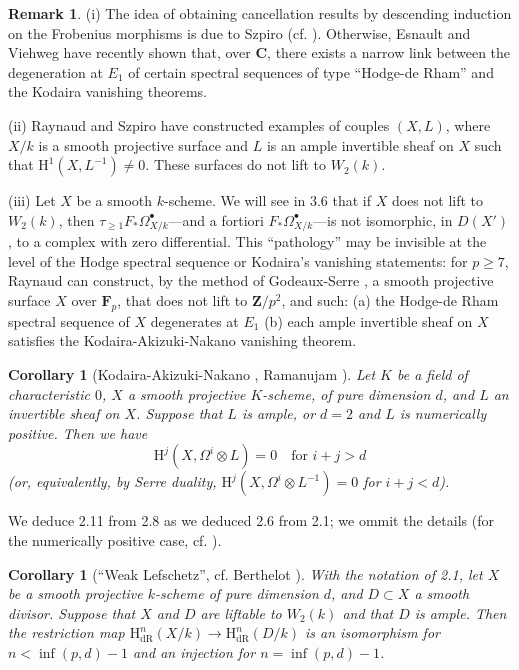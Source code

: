 \documentclass[10pt,reqno]{article}
\newcommand{\mbold}{\mathbf}
\newcommand{\dR}{\mathrm{dR}}
\renewcommand{\H}{\mathrm{H}}
\newcommand{\al}{_\ast}
\newcommand{\bh}{^\bullet}
\theoremstyle{plain}
\newtheorem{coro}[thm]{Corollary}
\theoremstyle{definition}
\newtheorem{rmk}[thm]{Remark}
\begin{document}
\begin{rmk}
(i) The idea of obtaining cancellation results by descending induction on the Frobenius morphisms is due
to Szpiro (cf. \cite{27,28,21}). Otherwise, Esnault and Viehweg \cite{7} have recently shown
that, over $\mbold{C}$, there exists a narrow link between the degeneration at $E_1$ of certain spectral sequences
of type ``Hodge-de Rham'' and the Kodaira vanishing theorems.

(ii) Raynaud \cite{24} and Szpiro \cite{9} have constructed examples of couples $(X,L)$, where $X/k$ is
a smooth projective surface and $L$ is an ample invertible sheaf on $X$ such that $\H^1(X,L^{-1})\neq 0$.
These surfaces do not lift to $W_2(k)$.

(iii) Let $X$ be a smooth $k$-scheme. We will see in 3.6 that if $X$ does not lift to $W_2(k)$, then
$\tau_{\geq 1}F\al\Omega_{X/k}\bh$---and a fortiori $F\al\Omega_{X/k}\bh$---is not isomorphic, in $D(X')$,
to a complex with zero differential. This ``pathology'' may be invisible at the level of the Hodge spectral sequence
or Kodaira's vanishing statements: for $p\geq 7$, Raynaud can construct, by the method of Godeaux-Serre \cite{25},
a smooth projective surface $X$ over $\mbold{F}_p$, that does not lift to $\mbold{Z}/p^2$, and such: (a) the
Hodge-de Rham spectral sequence of $X$ degenerates at $E_1$ (b) each ample invertible sheaf on $X$ satisfies the
Kodaira-Akizuki-Nakano vanishing theorem.
\end{rmk}

\begin{coro}[Kodaira-Akizuki-Nakano \cite{1,18}, Ramanujam \cite{23}]
Let $K$ be a field of characteristic $0$, $X$ a smooth projective $K$-scheme, of pure dimension $d$,
and $L$ an invertible sheaf on $X$. Suppose that $L$ is ample, or $d=2$ and $L$ is numerically positive.
Then we have
\[
  \H^j(X,\Omega^i\otimes L)=0\quad\text{for }i+j>d
\]
(or, equivalently, by Serre duality, $\H^j(X,\Omega^i\otimes L^{-1})=0$ for $i+j<d$).
\end{coro}

We deduce 2.11 from 2.8 as we deduced 2.6 from 2.1; we ommit the details (for the numerically positive case,
cf. \cite[p.~42]{21}).

\begin{coro}[``Weak Lefschetz'', cf. Berthelot \cite{2}]
With the notation of 2.1, let $X$ be a smooth projective $k$-scheme of pure dimension $d$, and $D\subset X$
a smooth divisor. Suppose that $X$ and $D$ are liftable to $W_2(k)$ and that $D$ is ample. Then the
restriction map $\H_\dR^n(X/k)\to\H_\dR^n(D/k)$ is an isomorphism for $n<\inf(p,d)-1$ and an injection
for $n=\inf(p,d)-1$.
\end{coro}
\end{document}
